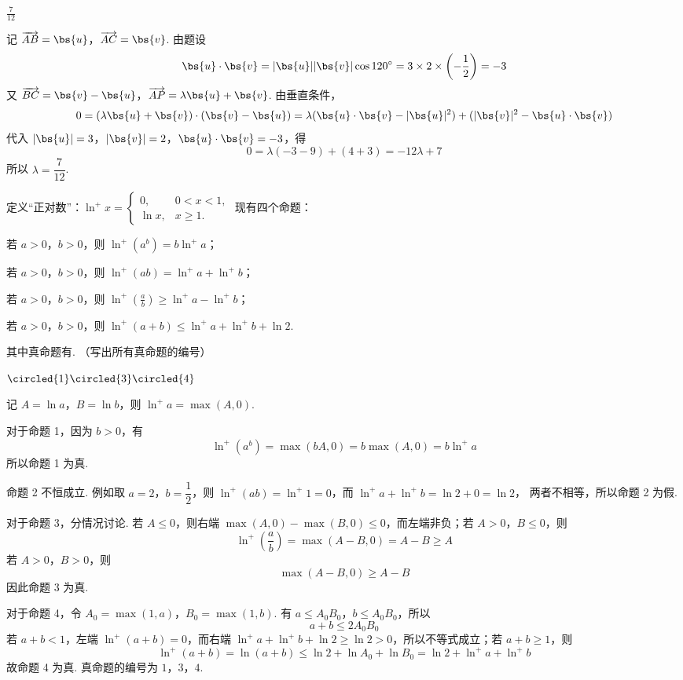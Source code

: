 \begin{answer}
\(\frac{7}{12}\)
\end{answer}

\begin{solution}
记 \(\overrightarrow{AB}=\bs{u}\)，\(\overrightarrow{AC}=\bs{v}\). 由题设
\[
\bs{u}\cdot\bs{v}=|\bs{u}||\bs{v}|\cos120^\circ
=3\times2\times\left(-\frac{1}{2}\right)=-3
\]
又 \(\overrightarrow{BC}=\bs{v}-\bs{u}\)，\(\overrightarrow{AP}=\lambda\bs{u}+\bs{v}\). 由垂直条件，
\[
0=(\lambda\bs{u}+\bs{v})\cdot(\bs{v}-\bs{u})
=\lambda(\bs{u}\cdot\bs{v}-|\bs{u}|^2)+(|\bs{v}|^2-\bs{u}\cdot\bs{v})
\]
代入 \(|\bs{u}|=3\)，\(|\bs{v}|=2\)，\(\bs{u}\cdot\bs{v}=-3\)，得
\[
0=\lambda(-3-9)+(4+3)=-12\lambda+7
\]
所以 \(\lambda=\dfrac{7}{12}\).
\end{solution}

\begin{problem}
定义“正对数”：\(\ln^+x = \begin{cases}
0, & 0 < x < 1,\\
\ln x, & x \geqslant 1.
\end{cases}\)
现有四个命题：

\begin{circlelist}
\item 若 \(a > 0\)，\(b > 0\)，则 \(\ln^+(a^b) = b\ln^+a\)；
\item 若 \(a > 0\)，\(b > 0\)，则 \(\ln^+(ab) = \ln^+a + \ln^+b\)；
\item 若 \(a > 0\)，\(b > 0\)，则 \(\ln^+\!\left(\frac{a}{b}\right) \geqslant \ln^+a - \ln^+b\)；
\item 若 \(a > 0\)，\(b > 0\)，则 \(\ln^+(a + b) \leqslant \ln^+a + \ln^+b + \ln 2\).
\end{circlelist}

其中真命题有\fillinblank{}. （写出所有真命题的编号）
\end{problem}

\begin{answer}
\(\circled{1}\circled{3}\circled{4}\)
\end{answer}

\begin{solution}
记 \(A=\ln a\)，\(B=\ln b\)，则 \(\ln^+a=\max(A,0)\).

对于命题 1，因为 \(b>0\)，有
\[
\ln^+(a^b)=\max(bA,0)=b\max(A,0)=b\ln^+a
\]
所以命题 1 为真.

命题 2 不恒成立. 例如取 \(a=2\)，\(b=\dfrac{1}{2}\)，则
\(\ln^+(ab)=\ln^+1=0\)，而 \(\ln^+a+\ln^+b=\ln2+0=\ln2\)，
两者不相等，所以命题 2 为假.

对于命题 3，分情况讨论. 若 \(A\leq0\)，则右端
\(\max(A,0)-\max(B,0)\leq0\)，而左端非负；若 \(A>0\)，\(B\leq0\)，则
\[
\ln^+\left(\frac{a}{b}\right)=\max(A-B,0)=A-B\geq A
\]
若 \(A>0\)，\(B>0\)，则
\[
\max(A-B,0)\geq A-B
\]
因此命题 3 为真.

对于命题 4，令 \(A_0=\max(1,a)\)，\(B_0=\max(1,b)\). 有 \(a\leq A_0B_0\)，\(b\leq A_0B_0\)，所以
\[
a+b\leq2A_0B_0
\]
若 \(a+b<1\)，左端 \(\ln^+(a+b)=0\)，而右端 \(\ln^+a+\ln^+b+\ln2\geq\ln2>0\)，所以不等式成立；若 \(a+b\geq1\)，则
\[
\ln^+(a+b)=\ln(a+b)
\leq\ln2+\ln A_0+\ln B_0
=\ln2+\ln^+a+\ln^+b
\]
故命题 4 为真. 真命题的编号为 \(1\)，\(3\)，\(4\).
\end{solution}

